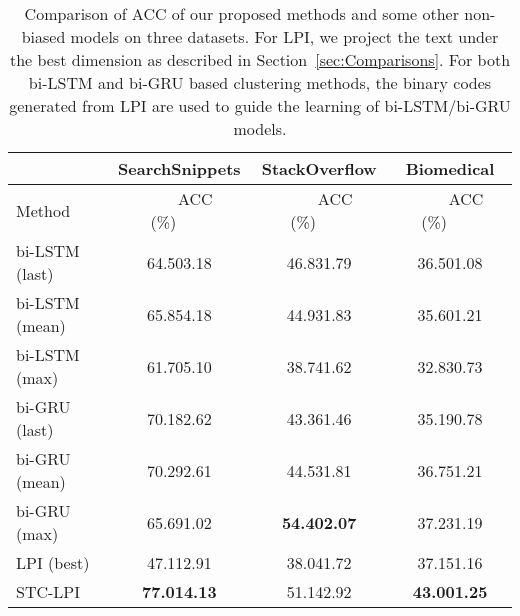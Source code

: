 \documentclass[review]{elsarticle}
\begin{document}
\begin{table*}[t] \begin{center}
\begin{tabular}{|l|c|c|c|}\hline
&SearchSnippets &StackOverflow &Biomedical\\\hline
Method     &~~~~ACC (\%)~~~~&~~~~ACC (\%)~~~~&~~~~ACC (\%)~~~~\\\hline \hline
bi-LSTM (last)& 64.503.18        & 46.831.79  & 36.501.08    \\
bi-LSTM (mean)& 65.854.18    & 44.931.83  & 35.601.21 \\
bi-LSTM (max) & 61.705.10     	&38.741.62	  &32.830.73\\
bi-GRU (last)& 70.182.62        & 43.361.46  & 35.190.78    \\
bi-GRU (mean)& 70.292.61    & 44.531.81  & 36.751.21 \\
bi-GRU (max) & 65.691.02     &	{\bf{54.402.07}}	  &37.231.19\\
\hline
LPI (best)& 47.112.91	& 38.041.72  &37.151.16\\
STC-LPI& {\bf{77.014.13}}	& 51.142.92	&{\bf{43.001.25}}\\\hline

\end{tabular}
\end{center}
\caption{\label{tb:Comparison_BIRNN} Comparison of ACC of our proposed methods and some other non-biased models on three datasets. For LPI, we project the text under the best dimension as described in Section~\ref{sec:Comparisons}. For both bi-LSTM and bi-GRU based clustering methods, the binary codes generated from LPI are used to guide the learning of bi-LSTM/bi-GRU models.}
\end{table*}
\end{document}
